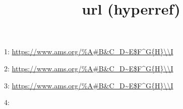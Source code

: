 \documentclass{amsart}
\title{url (hyperref)}
\begin{document}
\maketitle

1: \url{https://www.ams.org/%

\bigskip

2: \url{https://www.ams.org/\%A\#B\&C\_D\~E$F^G{H}\\I}

\bigskip

\def\myurl{https://www.ams.org/\%A\#B\&C\_D\~E$F^G{H}\\I}

3: \url{\myurl}

\bigskip

4: \A

% 
\end{document}
